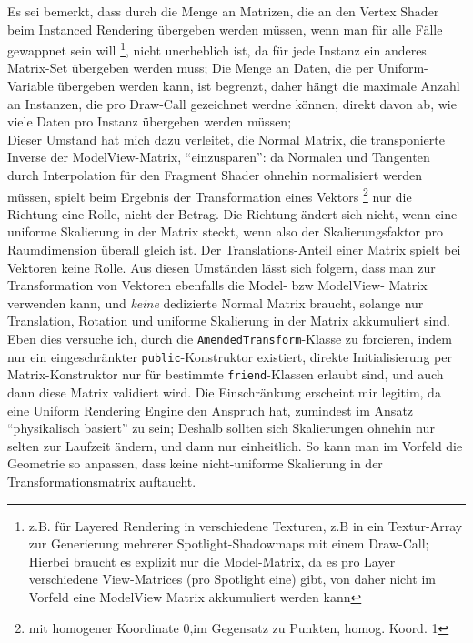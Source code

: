 	Es sei bemerkt, dass durch die Menge an Matrizen, die an den Vertex Shader beim Instanced Rendering übergeben
	werden müssen, wenn man für alle Fälle gewappnet sein will
	\footnote{z.B. für Layered Rendering in verschiedene Texturen, z.B in ein Textur-Array zur Generierung mehrerer 
	Spotlight-Shadowmaps mit einem Draw-Call; Hierbei braucht es explizit nur die Model-Matrix, da es pro Layer 
	verschiedene View-Matrices (pro Spotlight eine) gibt, von daher nicht im Vorfeld eine ModelView Matrix akkumuliert 
	werden kann}, nicht unerheblich ist, da für jede Instanz ein anderes Matrix-Set übergeben werden muss;
	Die Menge an Daten, die per Uniform-Variable übergeben werden kann, ist begrenzt, daher hängt die maximale Anzahl
	an Instanzen, die pro Draw-Call gezeichnet werdne können, direkt davon ab, wie viele Daten pro Instanz übergeben 
	werden müssen;\\
	Dieser Umstand hat mich dazu verleitet, die Normal Matrix, die transponierte Inverse der ModelView-Matrix,
	"`einzusparen"': da Normalen und Tangenten durch Interpolation für den Fragment Shader ohnehin normalisiert werden 
	müssen, spielt beim Ergebnis  der Transformation eines Vektors 
	\footnote{mit homogener Koordinate 0,im Gegensatz zu Punkten, homog. Koord. 1} 
	nur die Richtung eine Rolle, nicht der Betrag. Die Richtung ändert sich nicht,
	wenn eine uniforme Skalierung in der Matrix steckt, wenn also der Skalierungsfaktor pro Raumdimension überall gleich 
	ist. Der Translations-Anteil einer Matrix spielt bei Vektoren keine Rolle. Aus diesen Umständen lässt sich folgern, 
	dass man zur Transformation von Vektoren ebenfalls die Model- bzw ModelView- Matrix verwenden kann, 
	und \emph{keine} dedizierte Normal Matrix braucht,
	solange nur Translation, Rotation und uniforme Skalierung in der Matrix akkumuliert sind.\\
	Eben dies versuche ich, durch die \lstinline|AmendedTransform|-Klasse zu forcieren, indem nur ein eingeschränkter
	\lstinline|public|-Konstruktor existiert, direkte Initialisierung per Matrix-Konstruktor nur für bestimmte
	\lstinline|friend|-Klassen erlaubt sind, und auch dann diese Matrix validiert wird.
	Die Einschränkung erscheint mir legitim, da eine Uniform Rendering Engine den Anspruch hat, zumindest
	im Ansatz "`physikalisch basiert"' zu sein; Deshalb sollten sich  Skalierungen ohnehin nur selten
	zur Laufzeit ändern, und dann nur einheitlich. So kann man im Vorfeld die Geometrie so anpassen, 
	dass keine nicht-uniforme Skalierung in der Transformationsmatrix auftaucht.
	
